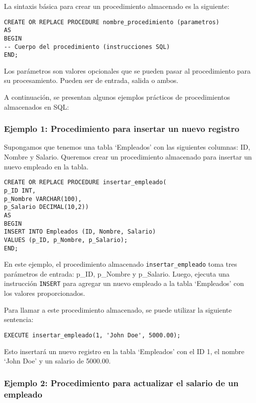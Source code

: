 \documentclass[executivepaper]{article}
\begin{document}
La sintaxis básica para crear un procedimiento almacenado es la siguiente:

\begin{lstlisting}
CREATE OR REPLACE PROCEDURE nombre_procedimiento (parametros)
AS
BEGIN
-- Cuerpo del procedimiento (instrucciones SQL)
END;
\end{lstlisting}

Los parámetros son valores opcionales que se pueden pasar al procedimiento para su procesamiento. Pueden ser de entrada, salida o ambos.

A continuación, se presentan algunos ejemplos prácticos de procedimientos almacenados en SQL:

\subsubsection*{Ejemplo 1: Procedimiento para insertar un nuevo registro}

Supongamos que tenemos una tabla \enquote*{Empleados} con las siguientes columnas: ID, Nombre y Salario. Queremos crear un procedimiento almacenado para insertar un nuevo empleado en la tabla.

\begin{lstlisting}
CREATE OR REPLACE PROCEDURE insertar_empleado(
p_ID INT,
p_Nombre VARCHAR(100),
p_Salario DECIMAL(10,2))
AS
BEGIN
INSERT INTO Empleados (ID, Nombre, Salario)
VALUES (p_ID, p_Nombre, p_Salario);
END;
\end{lstlisting}

En este ejemplo, el procedimiento almacenado \lstinline{insertar_empleado} toma tres parámetros de entrada: p\_ID, p\_Nombre y p\_Salario. Luego, ejecuta una instrucción \lstinline{INSERT} para agregar un nuevo empleado a la tabla \enquote*{Empleados} con los valores proporcionados.

Para llamar a este procedimiento almacenado, se puede utilizar la siguiente sentencia:

\begin{lstlisting}
EXECUTE insertar_empleado(1, 'John Doe', 5000.00);
\end{lstlisting}

Esto insertará un nuevo registro en la tabla \enquote*{Empleados} con el ID 1, el nombre \enquote*{John Doe} y un salario de 5000.00.

\subsubsection*{Ejemplo 2: Procedimiento para actualizar el salario de un empleado}
\end{document}
